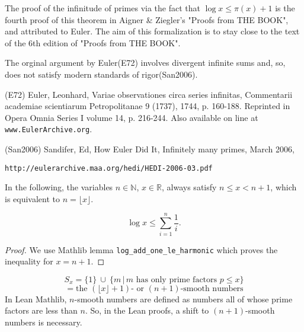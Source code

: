 The proof of the infinitude of primes via the fact that $\log x\le \pi(x)+1$ is the fourth proof of this theorem in Aigner \& Ziegler's "Proofs from THE BOOK", and attributed to Euler. The aim of this formalization is to stay close to the text of the 6th edition of "Proofs from THE BOOK".

The orginal argument by Euler(E72) involves divergent infinite sums and, so, does not satisfy
modern standards of rigor(San2006).

(E72)
Euler, Leonhard, Variae observationes circa series infinitas, Commentarii academiae scientiarum
Petropolitanae 9 (1737), 1744, p. 160-188. Reprinted in Opera Omnia Series I volume 14, p. 216-244.
Also available on line at \verb|www.EulerArchive.org|. 

(San2006)
Sandifer, Ed, How Euler Did It, Infinitely many primes, March 2006, \begin{verbatim}http://eulerarchive.maa.org/hedi/HEDI-2006-03.pdf\end{verbatim}

\begin{definition}
\label{def:nx}
In the following, the variables $n\in\mathbb{N}$, $x\in\mathbb{R}$, always satisfy
$n\le x < n+1$, which is equivalent to $n=\lfloor x\rfloor$. 
\end{definition}


\begin{lemma}
\label{lem:lemma0}
\leanok
$$\log x \le \sum_{i=1}^n\frac1i.$$
\end{lemma}
\begin{proof}
\leanok
    We use Mathlib lemma \verb|log_add_one_le_harmonic| which proves the inequality for $x=n+1$. 
\end{proof}

\begin{definition}
\label{def:S}
\leanok
    $$ S_x = \{1\}\ \cup\ \{m\,\big|\, \text{$m$ has only prime factors $p\le x$}\} $$
    $$ = \text{the $(\lfloor x\rfloor +1)$- or $(n+1)$-smooth numbers} $$
In Lean Mathlib, $n$-smooth numbers are defined as numbers all of whose prime factors are less than $n$.
    So, in the Lean proofs, a shift to $(n+1)$-smooth numbers is necessary.
\end{definition}

